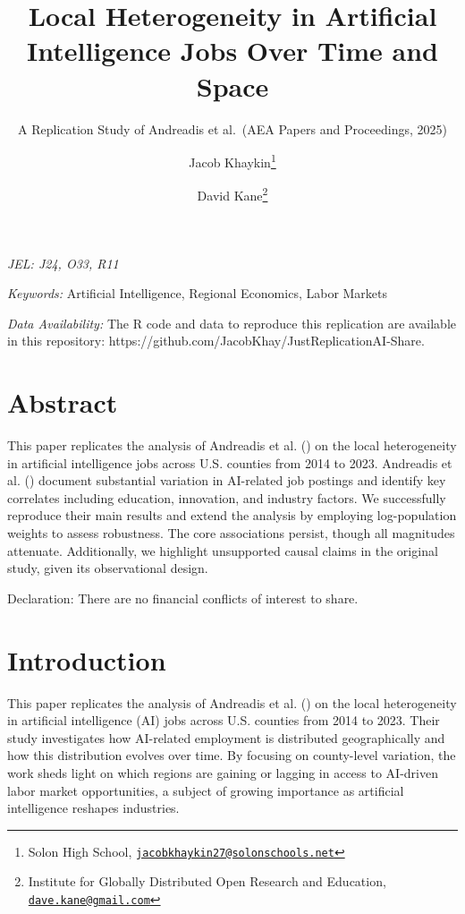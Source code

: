 \documentclass[
]{article}
\title{Local Heterogeneity in Artificial Intelligence Jobs Over Time and
Space}
\subtitle{A Replication Study of Andreadis et al.~(AEA Papers and
Proceedings, 2025)}
\author{Jacob Khaykin\footnote{Solon High School,
  \href{mailto:jacobkhaykin27@solonschools.net}{\nolinkurl{jacobkhaykin27@solonschools.net}}} \and David
Kane\footnote{Institute for Globally Distributed Open Research and
  Education,
  \href{mailto:dave.kane@gmail.com}{\nolinkurl{dave.kane@gmail.com}}}}
\date{}
\begin{document}
\maketitle


\emph{JEL: J24, O33, R11}

\emph{Keywords:} Artificial Intelligence, Regional Economics, Labor
Markets

\emph{Data Availability:} The R code and data to reproduce this
replication are available in this repository:
https://github.com/JacobKhay/JustReplicationAI-Share.

\section*{Abstract}\label{abstract}

This paper replicates the analysis of Andreadis et al.
() on the local heterogeneity in
artificial intelligence jobs across U.S. counties from 2014 to 2023.
Andreadis et al. () document
substantial variation in AI-related job postings and identify key
correlates including education, innovation, and industry factors. We
successfully reproduce their main results and extend the analysis by
employing log-population weights to assess robustness. The core
associations persist, though all magnitudes attenuate. Additionally, we
highlight unsupported causal claims in the original study, given its
observational design.

Declaration: There are no financial conflicts of interest to share.

\newpage

\section{Introduction}\label{introduction}

This paper replicates the analysis of Andreadis et al.
() on the local heterogeneity in
artificial intelligence (AI) jobs across U.S. counties from 2014 to
2023. Their study investigates how AI-related employment is distributed
geographically and how this distribution evolves over time. By focusing
on county-level variation, the work sheds light on which regions are
gaining or lagging in access to AI-driven labor market opportunities, a
subject of growing importance as artificial intelligence reshapes
industries.
\end{document}
